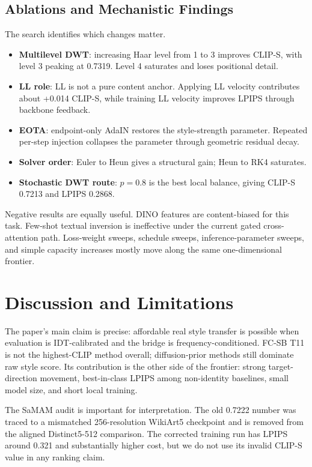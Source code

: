 \documentclass[letterpaper]{article}
\begin{document}
\subsection{Ablations and Mechanistic Findings}
The search identifies which changes matter.
\begin{itemize}
\item \textbf{Multilevel DWT}: increasing Haar level from 1 to 3 improves CLIP-S, with level 3 peaking at 0.7319. Level 4 saturates and loses positional detail.
\item \textbf{LL role}: LL is not a pure content anchor. Applying LL velocity contributes about +0.014 CLIP-S, while training LL velocity improves LPIPS through backbone feedback.
\item \textbf{EOTA}: endpoint-only AdaIN restores the style-strength parameter. Repeated per-step injection collapses the parameter through geometric residual decay.
\item \textbf{Solver order}: Euler to Heun gives a structural gain; Heun to RK4 saturates.
\item \textbf{Stochastic DWT route}: $p=0.8$ is the best local balance, giving CLIP-S 0.7213 and LPIPS 0.2868.
\end{itemize}

Negative results are equally useful. DINO features are content-biased for this task. Few-shot textual inversion is ineffective under the current gated cross-attention path. Loss-weight sweeps, schedule sweeps, inference-parameter sweeps, and simple capacity increases mostly move along the same one-dimensional frontier.

\section{Discussion and Limitations}
The paper's main claim is precise: affordable real style transfer is possible when evaluation is IDT-calibrated and the bridge is frequency-conditioned. FC-SB T11 is not the highest-CLIP method overall; diffusion-prior methods still dominate raw style score. Its contribution is the other side of the frontier: strong target-direction movement, best-in-class LPIPS among non-identity baselines, small model size, and short local training.

The SaMAM audit is important for interpretation. The old 0.7222 number was traced to a mismatched 256-resolution WikiArt5 checkpoint and is removed from the aligned Distinct5-512 comparison. The corrected training run has LPIPS around 0.321 and substantially higher cost, but we do not use its invalid CLIP-S value in any ranking claim.
\end{document}
